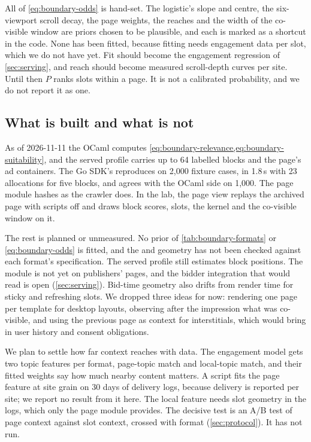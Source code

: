 All of \cref{eq:boundary-odds} is hand-set. The logistic's slope and centre,
the six-viewport scroll decay, the page weights, the reaches and the width of
the co-visible window are priors chosen to be plausible, and each is marked as
a shortcut in the code. None has been fitted, because fitting needs engagement
data per slot, which we do not have yet. Fit should become the engagement
regression of \cref{sec:serving}, and reach should become measured scroll-depth
curves per site. Until then $P$ ranks slots within a page. It is not a
calibrated probability, and we do not report it as one.

\subsection{What is built and what is not}\label{sec:boundary-status}

As of 2026-11-11 the OCaml  computes
\cref{eq:boundary-relevance,eq:boundary-suitability}, and the served profile
carries up to 64 labelled blocks and the page's ad containers. The Go SDK's
 reproduces  on 2,000 fixture cases, in
1.8\,\textmu s with 23 allocations for five blocks, and
 agrees with the OCaml side on 1,000. The page module
hashes as the crawler does. In the lab, the page view replays the archived
page with scripts off and draws block scores, slots, the kernel and the
co-visible window on it.

The rest is planned or unmeasured. No prior of \cref{tab:boundary-formats} or
\cref{eq:boundary-odds} is fitted, and the  and 
geometry has not been checked against each format's specification. The served
profile still estimates block positions. The module is not yet on publishers'
pages, and the bidder integration that would read  is open
(\cref{sec:serving}). Bid-time geometry also drifts from render time for
sticky and refreshing slots. We dropped three ideas for now: rendering one
page per template for desktop layouts, observing after the impression what was
co-visible, and using the previous page as context for interstitials, which
would bring in user history and consent obligations.

We plan to settle how far context reaches with data. The engagement model gets
two topic features per format, page-topic match and local-topic match, and
their fitted weights say how much nearby content matters. A script fits the
page feature at site grain on 30 days of delivery logs, because delivery is
reported per site; we report no result from it here. The local feature needs
slot geometry in the logs, which only the page module provides. The decisive
test is an A/B test of page context against slot context, crossed with format
(\cref{sec:protocol}). It has not run.
